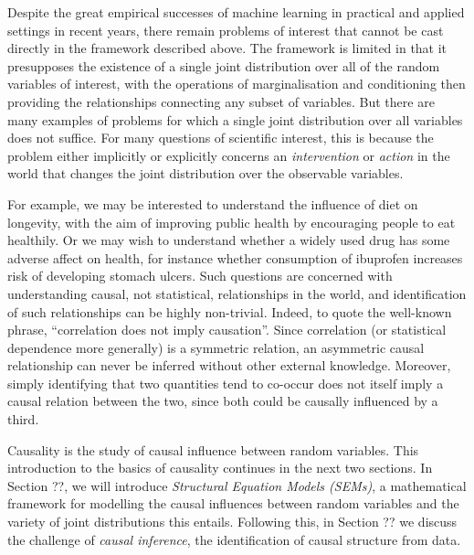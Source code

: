 Despite the great empirical successes of machine learning in practical and applied settings in recent years, there remain problems of interest that cannot be cast directly in the framework described above. 
The framework is limited in that it presupposes the existence of a single joint distribution over all of the random variables of interest, with the operations of marginalisation and conditioning then providing the relationships connecting any subset of variables.
But there are many examples of problems for which a single joint distribution over all variables does not suffice. 
For many questions of scientific interest, this is because the problem either implicitly or explicitly concerns an \emph{intervention} or \emph{action} in the world that changes the joint distribution over the observable variables.

For example, we may be interested to understand the influence of diet on longevity, with the aim of improving public health by encouraging people to eat healthily. Or we may wish to understand whether a widely used drug has some adverse affect on health, for instance whether consumption of ibuprofen increases risk of developing stomach ulcers.
Such questions are concerned with understanding causal, not statistical, relationships in the world, and identification of such relationships can be highly non-trivial. 
Indeed, to quote the well-known phrase, ``correlation does not imply causation''. 
Since correlation (or statistical dependence more generally) is a symmetric relation, an asymmetric causal relationship can never be inferred without other external knowledge. 
Moreover, simply identifying that two quantities tend to co-occur does not itself imply a causal relation between the two, since both could be causally influenced by a third.

Causality is the study of causal influence between random variables.
This introduction to the basics of causality continues in the next two sections.
In Section ??, we will introduce \emph{Structural Equation Models (SEMs)}, a mathematical framework for modelling the causal influences between random variables and the variety of joint distributions this entails.
Following this, in Section ?? we discuss the challenge of \emph{causal inference}, the identification of causal structure from data.






